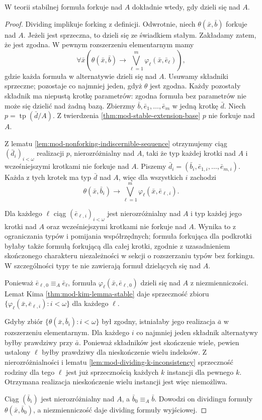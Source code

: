 \begin{twierdzenie}
\label{thm:mod-dividing-forking-arbitrary}
W teorii stabilnej formuła forkuje nad $A$
dokładnie wtedy, gdy dzieli się nad $A$.
\end{twierdzenie}
\begin{proof}
Dividing implikuje forking z definicji.
Odwrotnie, niech $\theta(\bar x,\bar b)$
forkuje nad $A$. Jeżeli jest sprzeczna,
to dzieli się ze świadkiem stałym.
Zakładamy zatem, że jest zgodna.
W pewnym rozszerzeniu elementarnym mamy
\[
\forall\bar x\left(
\theta(\bar x,\bar b)\to
\bigvee_{\ell=1}^{m}\varphi_\ell(\bar x,\bar e_\ell)
\right),
\]
gdzie każda formuła w alternatywie
dzieli się nad $A$. Usuwamy składniki sprzeczne;
pozostaje co najmniej jeden, gdyż $\theta$ jest zgodna.
Każdy pozostały składnik ma niepustą krotkę
parametrów: zgodna formuła bez parametrów
nie może się dzielić nad żadną bazą.
Zbierzmy $\bar b,\bar e_1,\ldots,\bar e_m$
w jedną krotkę $\bar d$.
Niech $p=\operatorname{tp}(\bar d/A)$.
Z twierdzenia \ref{thm:mod-stable-extension-base}
$p$ nie forkuje nad $A$.

Z lematu \ref{lem:mod-nonforking-indiscernible-sequence}
otrzymujemy ciąg $(\bar d_i)_{i<\omega}$
realizacji $p$, nierozróżnialny nad $A$,
taki że typ każdej krotki nad $A$
i wcześniejszymi krotkami nie forkuje nad $A$.
Piszemy
$\bar d_i=(\bar b_i,\bar e_{1,i},\ldots,\bar e_{m,i})$.
Każda z tych krotek ma typ $\bar d$ nad $A$,
więc dla wszystkich $i$ zachodzi
\[
\theta(\bar x,\bar b_i)\to
\bigvee_{\ell=1}^{m}\varphi_\ell(\bar x,\bar e_{\ell,i}).
\]

Dla każdego $\ell$ ciąg $(\bar e_{\ell,i})_{i<\omega}$
jest nierozróżnialny nad $A$ i typ każdej
jego krotki nad $A$ oraz wcześniejszymi
krotkami nie forkuje nad $A$.
Wynika to z ograniczania typów i pomijania
współrzędnych; formuła forkująca dla
podkrotki byłaby także formułą forkującą
dla całej krotki, zgodnie z uzasadnieniem
skończonego charakteru niezależności
w sekcji o rozszerzaniu typów bez forkingu.
W szczególności typy te nie zawierają
formuł dzielących się nad $A$.

Ponieważ $\bar e_{\ell,0}\equiv_A\bar e_\ell$,
formuła $\varphi_\ell(\bar x,\bar e_{\ell,0})$
dzieli się nad $A$ z niezmienniczości.
Lemat Kima \ref{thm:mod-kim-lemma-stable}
daje sprzeczność zbioru
$\{\varphi_\ell(\bar x,\bar e_{\ell,i}):i<\omega\}$
dla każdego $\ell$.

Gdyby zbiór $\{\theta(\bar x,\bar b_i):i<\omega\}$
był zgodny, istniałaby jego realizacja
$\bar a$ w rozszerzeniu elementarnym.
Dla każdego $i$ co najmniej jeden składnik
alternatywy byłby prawdziwy przy $\bar a$.
Ponieważ składników jest skończenie wiele,
pewien ustalony $\ell$ byłby prawdziwy
dla nieskończenie wielu indeksów.
Z nierozróżnialności i lematu
\ref{lem:mod-dividing-k-inconsistency}
sprzeczność rodziny dla tego $\ell$
jest już sprzecznością każdych $k$ instancji
dla pewnego $k$.
Otrzymana realizacja nieskończenie wielu
instancji jest więc niemożliwa.

Ciąg $(\bar b_i)$ jest nierozróżnialny
nad $A$, a $\bar b_0\equiv_A\bar b$.
Dowodzi on dividingu formuły
$\theta(\bar x,\bar b_0)$,
a niezmienniczość daje dividing
formuły wyjściowej.
\end{proof}


